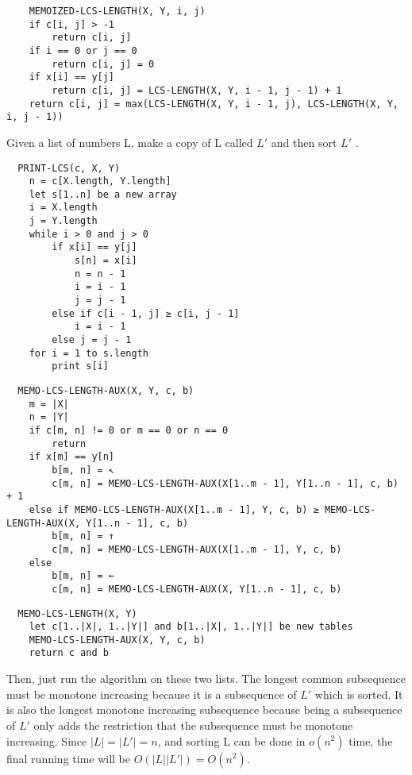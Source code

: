 \documentclass[a4paper, justified]{tufte-handout}
\begin{document}
\begin{problem}[TC 15.4-3]
\end{problem}

\begin{solution}
  \begin{verbatim}
    MEMOIZED-LCS-LENGTH(X, Y, i, j)
    if c[i, j] > -1
        return c[i, j]
    if i == 0 or j == 0
        return c[i, j] = 0
    if x[i] == y[j]
        return c[i, j] = LCS-LENGTH(X, Y, i - 1, j - 1) + 1
    return c[i, j] = max(LCS-LENGTH(X, Y, i - 1, j), LCS-LENGTH(X, Y, i, j - 1))

  \end{verbatim}
\end{solution}

\begin{problem}[TC 15.4-5]
\end{problem}

\begin{solution}
  Given a list of numbers L, make a copy of L called $L'$ and then sort $L'$
  .
  \begin{verbatim}
  PRINT-LCS(c, X, Y)
    n = c[X.length, Y.length]
    let s[1..n] be a new array
    i = X.length
    j = Y.length
    while i > 0 and j > 0
        if x[i] == y[j]
            s[n] = x[i]
            n = n - 1
            i = i - 1
            j = j - 1
        else if c[i - 1, j] ≥ c[i, j - 1]
            i = i - 1
        else j = j - 1
    for i = 1 to s.length
        print s[i]

 \end{verbatim}
  \begin{verbatim}
  MEMO-LCS-LENGTH-AUX(X, Y, c, b)
    m = |X|
    n = |Y|
    if c[m, n] != 0 or m == 0 or n == 0
        return
    if x[m] == y[n]
        b[m, n] = ↖
        c[m, n] = MEMO-LCS-LENGTH-AUX(X[1..m - 1], Y[1..n - 1], c, b) + 1
    else if MEMO-LCS-LENGTH-AUX(X[1..m - 1], Y, c, b) ≥ MEMO-LCS-LENGTH-AUX(X, Y[1..n - 1], c, b)
        b[m, n] = ↑
        c[m, n] = MEMO-LCS-LENGTH-AUX(X[1..m - 1], Y, c, b)
    else
        b[m, n] = ←
        c[m, n] = MEMO-LCS-LENGTH-AUX(X, Y[1..n - 1], c, b)

 \end{verbatim}
  \begin{verbatim}
  MEMO-LCS-LENGTH(X, Y)
    let c[1..|X|, 1..|Y|] and b[1..|X|, 1..|Y|] be new tables
    MEMO-LCS-LENGTH-AUX(X, Y, c, b)
    return c and b

 \end{verbatim}
  Then, just run the  algorithm on these two lists. The longest common subsequence must be monotone increasing because it is a subsequence of $L'$
  which is sorted. It is also the longest monotone increasing subsequence because being a subsequence of $L'$
  only adds the restriction that the subsequence must be monotone increasing. Since $|L| = |L'| = n$, and sorting L can be done in $o(n^2)$ time, the final running time will be $O(|L||L'|) = O(n^2)$.
\end{solution}
\end{document}
